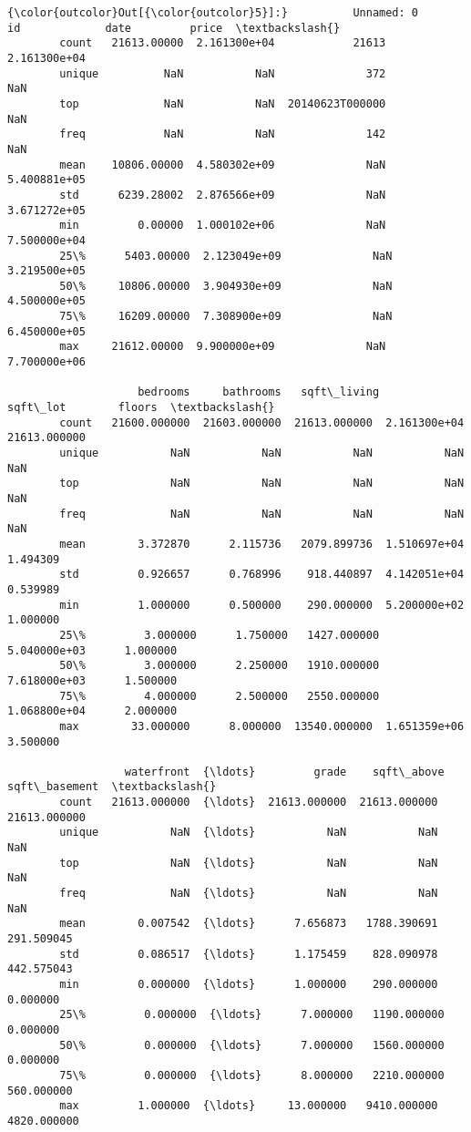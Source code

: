 \documentclass[11pt]{article}
\begin{document}
\begin{Verbatim}[commandchars=\\\{\}]
{\color{outcolor}Out[{\color{outcolor}5}]:}          Unnamed: 0            id             date         price  \textbackslash{}
        count   21613.00000  2.161300e+04            21613  2.161300e+04   
        unique          NaN           NaN              372           NaN   
        top             NaN           NaN  20140623T000000           NaN   
        freq            NaN           NaN              142           NaN   
        mean    10806.00000  4.580302e+09              NaN  5.400881e+05   
        std      6239.28002  2.876566e+09              NaN  3.671272e+05   
        min         0.00000  1.000102e+06              NaN  7.500000e+04   
        25\%      5403.00000  2.123049e+09              NaN  3.219500e+05   
        50\%     10806.00000  3.904930e+09              NaN  4.500000e+05   
        75\%     16209.00000  7.308900e+09              NaN  6.450000e+05   
        max     21612.00000  9.900000e+09              NaN  7.700000e+06   
        
                    bedrooms     bathrooms   sqft\_living      sqft\_lot        floors  \textbackslash{}
        count   21600.000000  21603.000000  21613.000000  2.161300e+04  21613.000000   
        unique           NaN           NaN           NaN           NaN           NaN   
        top              NaN           NaN           NaN           NaN           NaN   
        freq             NaN           NaN           NaN           NaN           NaN   
        mean        3.372870      2.115736   2079.899736  1.510697e+04      1.494309   
        std         0.926657      0.768996    918.440897  4.142051e+04      0.539989   
        min         1.000000      0.500000    290.000000  5.200000e+02      1.000000   
        25\%         3.000000      1.750000   1427.000000  5.040000e+03      1.000000   
        50\%         3.000000      2.250000   1910.000000  7.618000e+03      1.500000   
        75\%         4.000000      2.500000   2550.000000  1.068800e+04      2.000000   
        max        33.000000      8.000000  13540.000000  1.651359e+06      3.500000   
        
                  waterfront  {\ldots}         grade    sqft\_above  sqft\_basement  \textbackslash{}
        count   21613.000000  {\ldots}  21613.000000  21613.000000   21613.000000   
        unique           NaN  {\ldots}           NaN           NaN            NaN   
        top              NaN  {\ldots}           NaN           NaN            NaN   
        freq             NaN  {\ldots}           NaN           NaN            NaN   
        mean        0.007542  {\ldots}      7.656873   1788.390691     291.509045   
        std         0.086517  {\ldots}      1.175459    828.090978     442.575043   
        min         0.000000  {\ldots}      1.000000    290.000000       0.000000   
        25\%         0.000000  {\ldots}      7.000000   1190.000000       0.000000   
        50\%         0.000000  {\ldots}      7.000000   1560.000000       0.000000   
        75\%         0.000000  {\ldots}      8.000000   2210.000000     560.000000   
        max         1.000000  {\ldots}     13.000000   9410.000000    4820.000000   
        

\end{Verbatim}
\end{document}
